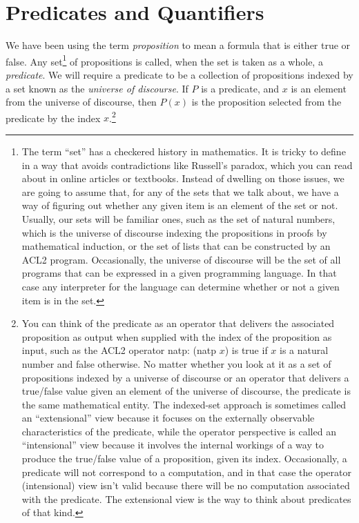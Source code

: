 {{\begin{ExerciseList}
\end{ExerciseList}


\section{Predicates and Quantifiers}
\label{sec:predicates-and-quantifiers}

\label{proposition-def}
We have been using the term \emph{proposition}
to mean a formula that is either true or false.
Any set\footnote{The
term
``set'' has a checkered history in mathematics.
It is tricky to define in a way that avoids contradictions
like Russell's paradox, which you can read about
in online articles or textbooks.
Instead of dwelling on those issues,
we are going to assume that,
for any of the sets that we talk about,
we have a way of figuring out whether any given
item is an element of the set or not.
Usually, our sets will be familiar ones,
such as the set of natural numbers, which
is the universe of discourse indexing the propositions
in proofs by mathematical induction, or
the set of lists that can be constructed
by an ACL2 program.
Occasionally, the universe of discourse will be
the set of all programs that can be expressed in a given
programming language.
In that case
any interpreter for the language
can determine whether or
not a given item is in the set.}
of propositions is called,
when the set is taken as a whole, a
\label{predicate-def}\emph{predicate}.
We will require a predicate
to be a collection of propositions
indexed by a set known as the
\label{def-universe-of-discourse}\emph{universe of discourse}.
If $P$ is a predicate, and $x$ is an element from
the universe of discourse, then $P(x)$ is
the proposition
selected from the predicate by the index $x$.\footnote{You
can think of the predicate as an
operator that delivers the associated proposition as output
when supplied with the index of the proposition as input,
such as the ACL2 operator natp: (natp $x$) is true if
$x$ is a natural number and false otherwise.
No matter whether you look at it as a set of propositions
indexed by a universe of discourse or an operator that
delivers a true/false value given an element of the universe of discourse,
the predicate is the same mathematical entity.
The indexed-set approach is sometimes called an ``extensional'' view
because it focuses on the externally observable characteristics of the predicate,
while the operator perspective is called an ``intensional'' view
because it involves the internal workings of a way to produce the true/false value
of a proposition, given its index.
Occasionally, a predicate will not correspond to a computation,
and in that case the operator (intensional) view
isn't valid because there will be no
computation associated with the predicate.
The extensional view is the way
to think about predicates of that kind.}

}}
